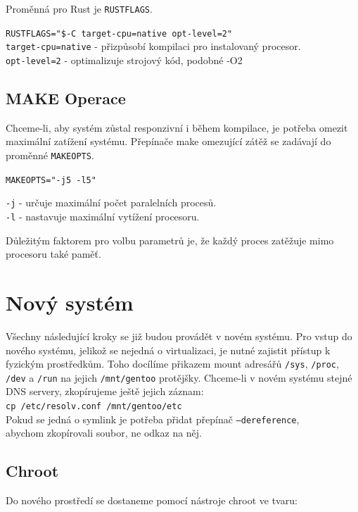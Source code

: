 \documentclass[12pt,a4paper,twoside,]{article}
\begin{document}
{\hspace*{-1.5em}Proměnná pro Rust je \texttt{RUSTFLAGS}.

\texttt{RUSTFLAGS="\$-C target-cpu=native opt-level=2"}\\

\hspace*{-1.5em}\texttt{target-cpu=native} - přizpůsobí kompilaci pro instalovaný procesor.\\
\texttt{opt-level=2} - optimalizuje strojový kód, podobné -O2      %

\subsection{MAKE Operace}
Chceme-li, aby systém zůstal responzivní i během kompilace, je potřeba omezit maximální zatížení systému.
Přepínače make omezující zátěž se zadávají do proměnné \texttt{MAKEOPTS}.

\texttt{MAKEOPTS="-j5 -l5"}

\hspace{-1.5em}\texttt{-j} - určuje maximální počet paralelních procesů.\\
\texttt{-l} - nastavuje maximální vytížení procesoru.

\hspace{-1.5em}Důležitým faktorem pro volbu parametrů je, že každý proces zatěžuje mimo procesoru také paměť.

\newpage
\section{Nový systém}
Všechny následující kroky se již budou provádět v novém systému.
Pro vstup do nového systému, jelikož se nejedná o virtualizaci, je nutné zajistit přístup k fyzickým prostředkům.
Toho docílíme přikazem mount adresářů \texttt{/sys}, \texttt{/proc}, \texttt{/dev} a \texttt{/run} na jejich \texttt{/mnt/gentoo} protějšky. Chceme-li v novém 
systému stejné DNS servery, zkopírujeme ještě jejich záznam: \\ \texttt{cp /etc/resolv.conf /mnt/gentoo/etc}\\ Pokud se jedná o symlink
je potřeba přidat přepínač  \texttt{--dereference}, 
\\abychom zkopírovali soubor, ne odkaz na něj. 
\subsection{Chroot}
Do nového prostředí se dostaneme pomocí nástroje chroot ve tvaru:

}
\end{document}
